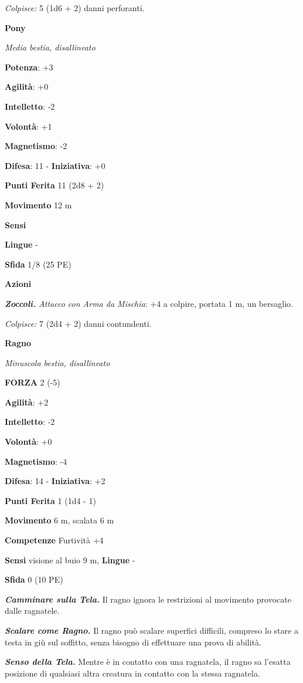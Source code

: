\begin{multicols}{2}
\emph{Colpisce:} 5 (1d6 + 2) danni perforanti.

\textbf{Pony}

\emph{Media bestia, disallineato}

\textbf{Potenza}: +3

\textbf{Agilità}: +0

\textbf{Intelletto}: -2

\textbf{Volontà}: +1

\textbf{Magnetismo}: -2

\textbf{Difesa}: 11 - \textbf{Iniziativa}: +0

\textbf{Punti Ferita} 11 (2d8 + 2)

\textbf{Movimento} 12 m

\textbf{Sensi} 

\textbf{Lingue} -

\textbf{Sfida} 1/8 (25 PE)\smallskip

\smallskip\textbf{Azioni}

\emph{\textbf{Zoccoli.} Attacco con Arma da Mischia}: +4 a colpire,
portata 1 m, un bersaglio.

\emph{Colpisce:} 7 (2d4 + 2) danni contundenti.

\textbf{Ragno}

\emph{Minuscola bestia, disallineato}

\textbf{FORZA} 2 (-5)

\textbf{Agilità}: +2

\textbf{Intelletto}: -2

\textbf{Volontà}: +0

\textbf{Magnetismo}: -4

\textbf{Difesa}: 14 - \textbf{Iniziativa}: +2

\textbf{Punti Ferita} 1 (1d4 - 1)

\textbf{Movimento} 6 m, scalata 6 m

\textbf{Competenze} Furtività +4

\textbf{Sensi} visione al buio 9 m, 
\textbf{Lingue} -

\textbf{Sfida} 0 (10 PE)\smallskip

\emph{\textbf{Camminare sulla Tela.}} Il ragno ignora le restrizioni al
movimento provocate dalle ragnatele.

\emph{\textbf{Scalare come Ragno.}} Il ragno può scalare superfici
difficili, compreso lo stare a testa in giù sul soffitto, senza bisogno
di effettuare una prova di abilità.

\emph{\textbf{Senso della Tela.}} Mentre è in contatto con una
ragnatela, il ragno sa l'esatta posizione di qualsiasi altra creatura in
contatto con la stessa ragnatela.


\end{multicols}

